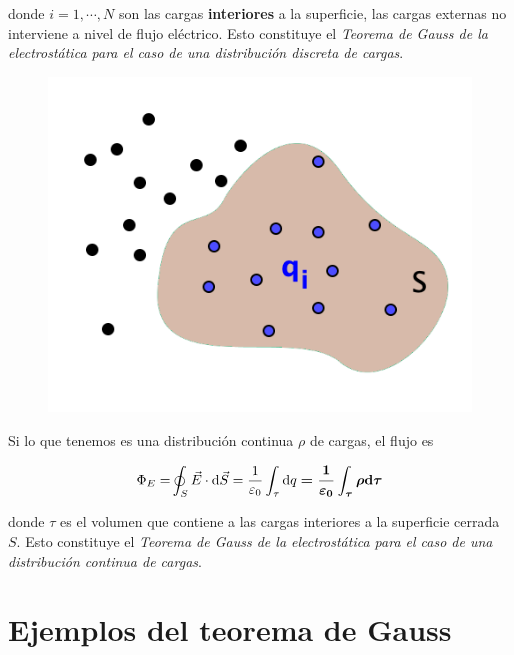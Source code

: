 \begin{multicols}{2}
donde $i=1,\cdots , N$ son las cargas \textbf{interiores} a la superficie, las cargas externas no interviene a nivel de flujo eléctrico. Esto constituye el \emph{Teorema de Gauss de la electrostática para el caso de una distribución discreta de cargas}.

\begin{figure}[H]
	\centering
	\includegraphics[width=.35\textwidth]{imagenes/imagenes23/T23IM07.png}
\end{figure}
\end{multicols}

Si lo que tenemos es una distribución continua $\rho$ de cargas, el flujo es

$$\displaystyle \displaystyle{ \Phi_E=} \oint_S \vec E \cdot \dd \vec S=\dfrac 1 {\varepsilon_0} \int_\tau \dd q \boldsymbol{ = \dfrac 1 {\varepsilon_0} \int_\tau \rho \dd \tau}$$

donde $\tau$ es el volumen que contiene a  las cargas interiores a la superficie cerrada $S$.
Esto constituye el \emph{Teorema de Gauss de la electrostática para el caso de una distribución continua de cargas}.

\section{Ejemplos del teorema de Gauss}

